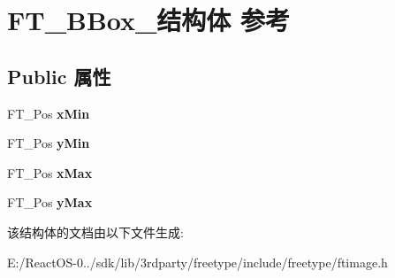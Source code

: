 \hypertarget{struct_f_t___b_box__}{}\section{F\+T\+\_\+\+B\+Box\+\_\+结构体 参考}
\label{struct_f_t___b_box__}
\subsection*{Public 属性}
\begin{DoxyCompactItemize}
\item 
\mbox{\label{struct_f_t___b_box___a1f2a5d0565d496c1d41e43d018f45add}} 
F\+T\+\_\+\+Pos {\bfseries x\+Min}
\item 
\mbox{\label{struct_f_t___b_box___a959ca1d5bc1c5338da0d85c8e7135f4e}} 
F\+T\+\_\+\+Pos {\bfseries y\+Min}
\item 
\mbox{\label{struct_f_t___b_box___ac6da5c44f4cb7b97eef1f438eb69c0ec}} 
F\+T\+\_\+\+Pos {\bfseries x\+Max}
\item 
\mbox{\label{struct_f_t___b_box___a77084921589f386a8a593ae1f25b1569}} 
F\+T\+\_\+\+Pos {\bfseries y\+Max}
\end{DoxyCompactItemize}


该结构体的文档由以下文件生成\+:\begin{DoxyCompactItemize}
\item 
E\+:/\+React\+O\+S-\/0../sdk/lib/3rdparty/freetype/include/freetype/ftimage.\+h\end{DoxyCompactItemize}
